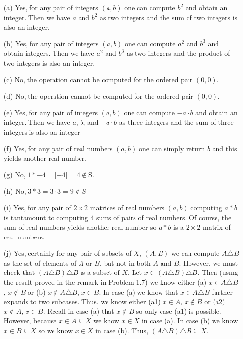 \documentclass[12pt]{article}
\numberwithin{theorem}{section}
\numberwithin{equation}{section}
\numberwithin{remark}{section}
\numberwithin{definition}{section}
\numberwithin{theorem}{section}
\numberwithin{lemma}{section}
\numberwithin{example}{section}
\begin{document}
\begin{itemize}
	\item[(a)]{Yes, for any pair of integers $(a,b)$ one can compute $b^2$ and obtain an integer. Then we have $a$ and $b^2$ as two integers and the sum of two integers is also an integer.}
	\item[(b)]{Yes, for any pair of integers $(a,b)$ one can compute $a^2$ and $b^3$ and obtain integers. Then we have $a^2$ and $b^3$ as two integers and the product of two integers is also an integer.}
	\item[(c)]{No, the operation cannot be computed for the ordered pair $(0,0)$.}
	\item[(d)]{No, the operation cannot be computed for the ordered pair $(0,0)$.}
	\item[(e)]{Yes, for any pair of integers $(a,b)$ one can compute $-a\cdot b$ and obtain an integer. Then we have $a$, $b$, and $-a\cdot b$ as three integers and the sum of three integers is also an integer.}
	\item[(f)]{Yes, for any pair of real numbers $(a,b)$ one can simply return $b$ and this yields another real number.}
	\item[(g)]{No, $1*-4=|-4|=4\notin$S.}
	\item[(h)]{No, $3*3=3\cdot3=9\notin S$}
	\item[(i)]{Yes, for any pair of $2\times2$ matrices of real numbers $(a,b)$ computing $a*b$ is tantamount to computing 4 sums of pairs of real numbers. Of course, the sum of real numbers yields another real number so $a*b$ is a $2\times2$ matrix of real numbers.}
	\item[(j)]{Yes, certainly for any pair of subsets of $X$, $(A,B)$ we can compute $A\triangle B$ as the set of elements of $A$ or $B$, but not in both $A$ and $B$. However, we must check that $\left(A\triangle B\right)\triangle B$ is a subset of $X$. Let $x\in \left(A\triangle B\right)\triangle B$. Then (using the result proved in the remark in Problem 1.7) we know either (a) $x\in A\triangle B$, $x\notin B$ or (b) $x\notin A \triangle B$, $x\in B$. In case (a) we know that $x\in A \triangle B$ further expands to two subcases. Thus, we know either (a1) $x\in A$, $x\notin B$ or (a2) $x\notin A$, $x\in B$. Recall in case (a) that $x\notin B$ so only case (a1) is possible. However, because $x\in A\subseteq X$ we know $x\in X$ in case (a). In case (b) we know $x\in B \subseteq X$ so we know $x\in X$ in case (b). Thus, $\left(A\triangle B\right)\triangle B \subseteq X$.} 
\end{itemize}
\end{document}
